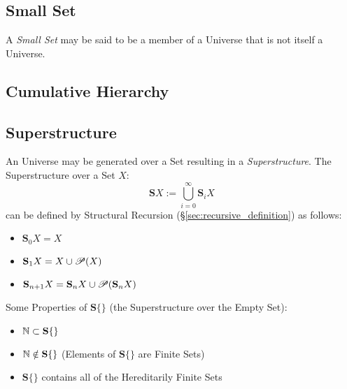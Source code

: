 \subsection{Small Set}\label{sec:small_set}

A \emph{Small Set} may be said to be a member of a Universe that is
not itself a Universe.



\subsection{Cumulative Hierarchy}\label{sec:cumulative_hierarchy}

\subsection{Superstructure}\label{sec:superstructure}

An Universe may be generated over a Set resulting in a
\emph{Superstructure}. The Superstructure over a Set $X$:
\[
  \mathbf{S}X := \bigcup^{\infty}_{i=0}\mathbf{S}_i X
\]
can be defined by Structural Recursion
(\S\ref{sec:recursive_definition}) as follows:
\begin{itemize}

\item $\mathbf{S}_0 X = X$
\item $\mathbf{S}_1 X = X \cup \mathscr{P}(X)$
\item $\mathbf{S}_{n+1} X =
  \mathbf{S}_n X \cup \mathscr{P}(\mathbf{S}_n X)$

\end{itemize}
Some Properties of $\mathbf{S}\{\}$ (the Superstructure over the Empty
Set):
\begin{itemize}

\item $\mathbb{N} \subset \mathbf{S}\{\}$
\item $\mathbb{N} \notin \mathbf{S}\{\}$ (Elements of $\mathbf{S}\{\}$
  are Finite Sets)
\item $\mathbf{S}\{\}$ contains all of the Hereditarily Finite Sets

\end{itemize}

